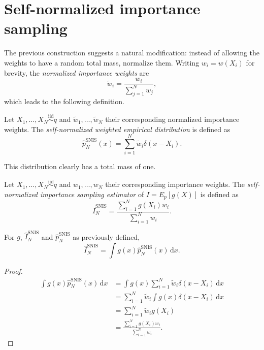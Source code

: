 \section{Self-normalized importance sampling}
\label{sec:self_normalized_importance_sampling}
The previous construction suggests a natural modification: instead of allowing the weights to have a random total mass, normalize them. Writing $w_i = w(X_i)$ for brevity, the \emph{normalized importance weights} are
\begin{equation}
    \tilde{w}_i = \frac{w_i}{\sum_{j=1}^{N} w_j},
\end{equation}
which leads to the following definition.
\begin{definition}
    Let $X_1,\ldots,X_N \overset{\mathrm{iid}}{\sim} q$ and $\tilde{w}_1,\ldots,\tilde{w}_N$ their corresponding normalized importance weights.
    The \emph{self-normalized weighted empirical distribution} is defined as
    \begin{equation}
        \hat{p}_N^{\mathrm{SNIS}}(x) = \sum_{i=1}^{N} \tilde{w}_i \delta(x-X_i).
    \end{equation}
\end{definition}
This distribution clearly has a total mass of one.
\begin{definition}
    Let $X_1,\ldots,X_N \overset{\mathrm{iid}}{\sim} q$ and $w_1,\ldots,w_N$ their corresponding importance weights.
    The \emph{self-normalized importance sampling estimator} of $I=E_p[g(X)]$ is defined as
    \begin{equation}
        \hat{I}_N^{\mathrm{SNIS}} = \frac{\sum_{i=1}^{N} g(X_i)w_i}{\sum_{i=1}^{N}w_i}.
    \end{equation}
\end{definition}

\begin{proposition}
    For $g$, $\hat{I}_N^{\mathrm{SNIS}}$ and $\hat{p}_N^{\mathrm{SNIS}}$ as previously defined,
    \begin{equation}
        \hat{I}_N^{\mathrm{SNIS}} = \int g(x) \hat{p}_N^{\mathrm{SNIS}}(x)\, \mathrm{d}x.
    \end{equation}
\end{proposition}
\begin{proof}
    \begin{align}
        \int g(x) \hat{p}_N^{\mathrm{SNIS}}(x)\, \mathrm{d}x &= \int g(x) \sum_{i=1}^{N} \tilde{w}_i \delta(x-X_i)\,\mathrm{d}x \\
        &= \sum_{i=1}^{N} \tilde{w}_i \int g(x) \delta(x-X_i)\,\mathrm{d}x \\
        &= \sum_{i=1}^{N} \tilde{w}_i g(X_i) \\
        &= \frac{\sum_{i=1}^{N} g(X_i)w_i}{\sum_{i=1}^{N}w_i}.
    \end{align}
\end{proof}

